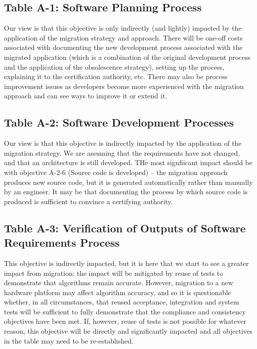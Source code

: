 \documentclass{llncs}
\begin{document}
\subsection{Table A-1: Software Planning Process}
Our view is that this objective is only indirectly (and lightly) impacted by the application of the migration strategy and approach. There will be one-off costs associated with documenting the new development process associated with the migrated application (which is a combination of the original development process and the application of the obsolescence strategy), setting up the process, explaining it to the certification authority, etc. There may also be process improvement issues as developers become more experienced with the migration approach and can see ways to improve it or extend it. 

\subsection{Table A-2: Software Development Processes}
Our view is that this objective is indirectly impacted by the application of the migration strategy. We are assuming that the requirements have not changed, and that an architecture is still developed. THe most signfiicant impact should be with objective A-2-6 (Source code is developed) -- the migration approach produces new source code, but it is generated automatically rather than manually by an engineer. It may be that documenting the process by which source code is produced is sufficient to convince a certifying authority.

\subsection{Table A-3: Verification of Outputs of Software Requirements Process}
This objective is indirectly impacted, but it is here that we start to see a greater impact from migration: the impact will be mitigated by reuse of tests to demonstrate that algorithms remain accurate. However, migration to a new hardware platform may affect algorithm accuracy, and so it is questionable whether, in all circumstances, that reused acceptance, integration and system tests will be sufficient to fully demonstrate that the compliance and consistency objectives have been met. If, however, reuse of tests is not possible for whatever reason, this objective will be directly and significantly impacted and all objectives in the table may need to be re-established.
\end{document}
